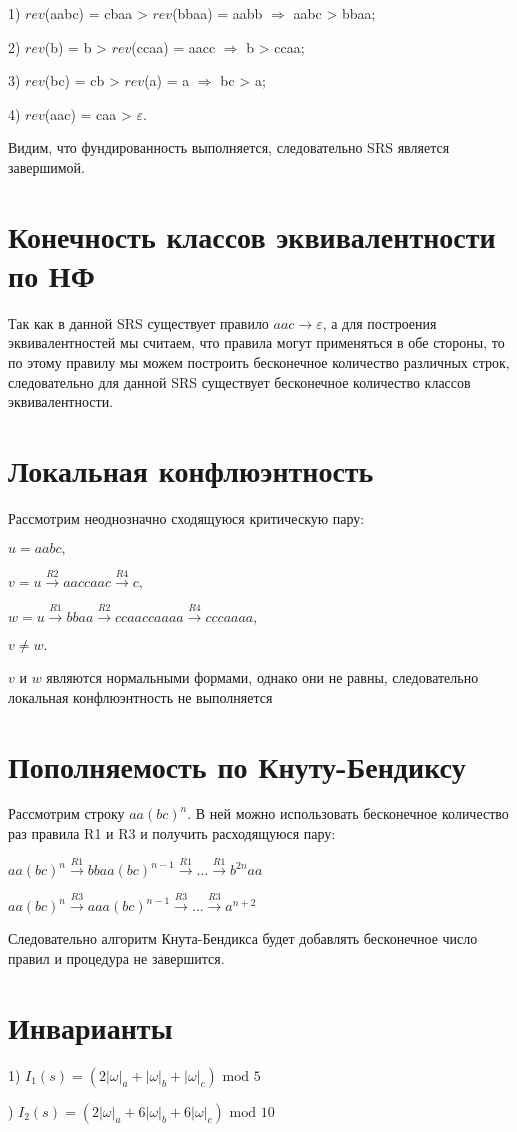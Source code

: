 \documentclass[12pt]{article}
\begin{document}
1) $rev$(aabc) = cbaa > $rev$(bbaa) = aabb $\Rightarrow$ aabc > bbaa;

2) $rev$(b) = b > $rev$(ccaa) = aacc $\Rightarrow$ b > ccaa;

3) $rev$(bc) = cb > $rev$(a) = a $\Rightarrow$ bc > a;

4) $rev$(aac) = caa > $\varepsilon$.

Видим, что фундированность выполняется, следовательно SRS является завершимой.

\section{Конечность классов эквивалентности по НФ}
Так как в данной SRS существует правило $aac \rightarrow \varepsilon$, а для построения эквивалентностей мы считаем, что правила могут применяться в обе стороны, то по этому правилу мы можем построить бесконечное количество различных строк, следовательно для данной SRS существует бесконечное количество классов эквивалентности.

\section{Локальная конфлюэнтность}

Рассмотрим неоднозначно сходящуюся критическую пару:

$u = aabc,$

$v = u \xrightarrow{R2} aaccaac \xrightarrow{R4} c,$ 

$w  = u\xrightarrow{R1} bbaa \xrightarrow{R2} ccaaccaaaa \xrightarrow{R4} cccaaaa,$

$v \neq w.$

$v$ и $w$ являются нормальными формами, однако они не равны, следовательно локальная конфлюэнтность не выполняется

\section{Пополняемость по Кнуту-Бендиксу}

\hspace{12px} Рассмотрим строку $aa(bc)^n$. В ней можно использовать бесконечное количество раз правила R1 и R3 и получить расходящуюся пару:

$aa(bc)^n \xrightarrow{R1} bbaa(bc)^{n-1} \xrightarrow{R1} \dots \xrightarrow{R1} b^{2n}aa$ 

$aa(bc)^n \xrightarrow{R3} aaa(bc)^{n-1} \xrightarrow{R3} \dots \xrightarrow{R3} a^{n+2}$

Следовательно алгоритм Кнута-Бендикса будет добавлять бесконечное число правил и процедура не завершится.

\section{Инварианты}

1) $I_1(s) = (2|\omega|_a + |\omega|_b + |\omega|_c) \text{ mod 5}$

) $I_2(s) = (2|\omega|_a + 6|\omega|_b + 6|\omega|_c) \text{ mod 10}$
\end{document}
